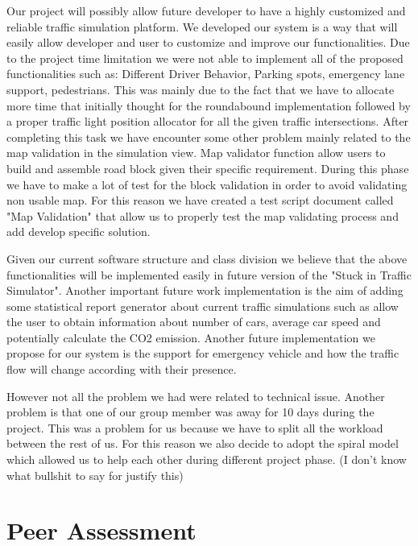 \documentclass[oneside]{article}
\begin{document}
\noindent Our project will possibly allow future developer to have a highly customized and reliable traffic simulation platform. We developed our system is a way that will easily allow developer and user to customize and improve our functionalities. Due to the project time limitation we were not able to implement all of the proposed functionalities such as: Different Driver Behavior, Parking spots, emergency lane support, pedestrians. This was mainly due to the fact that we have to allocate more time that initially thought for the roundabound implementation followed by a proper traffic light position allocator for all the given traffic intersections. After completing this task we have encounter some other problem mainly related to the map validation in the simulation view. Map validator function allow users to build and assemble road block given their specific requirement. During this phase we have to make a lot of test for the block validation in order to avoid validating non usable map. For this reason we have created a test script document called "Map Validation" that allow us to properly test the map validating process and add develop specific solution.
\newline

\noindent Given our current software structure and class division we believe that the above functionalities will be implemented easily in future version of the "Stuck in Traffic Simulator". Another important future work implementation is the aim of adding some statistical report generator about current traffic simulations such as allow the user to obtain information about number of cars, average car speed and potentially calculate the CO2 emission. Another future implementation we propose for our system is the support for emergency vehicle and how the traffic flow will change according with their presence. 
\newline

\noindent However not all the problem we had were related to technical issue. Another problem is that one of our group member was away for 10 days during the project. This was a problem for us because we have to split all the workload between the rest of us. For this reason we also decide to adopt the spiral model which allowed us to help each other during different project phase. (I don't know what bullshit to say for justify this)


\newpage
\section{Peer Assessment}
\end{document}
